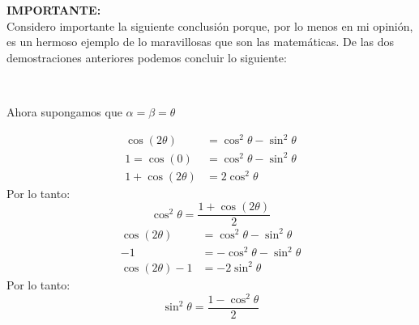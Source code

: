 \documentclass[12pt,openany]{book}
\begin{document}
			\noindent\textbf{IMPORTANTE:}\\
				Considero importante la siguiente conclusi\'on porque, por lo menos en mi opini\'on, es un
				hermoso ejemplo de lo maravillosas que son las matem\'aticas. 
				De las dos demostraciones anteriores podemos concluir lo siguiente:\\
				\begin{center}
					\doublebox{$\cos(\alpha\pm\beta)=\cos\alpha\cos\beta \pm \sin\alpha\sin\beta$}\\
				\end{center}
				Ahora supongamos que $\alpha=\beta=\theta$
				\begin{multicols}{2}
				\columnseprulecolor{\color{black}}
		    	\setlength{\columnseprule}{1pt}
					\begin{center}
						\begin{equation*}
							\begin{split}
								\cos(2\theta)&=\cos^{2}\theta-\sin^{2}\theta\\
								1=\cos(0)&=\cos^{2}\theta-\sin^{2}\theta\\
								1+\cos(2\theta)&=2\cos^{2}\theta
							\end{split}
						\end{equation*}
						Por lo tanto:
						$$
							\cos^{2}\theta=\frac{1+\cos(2\theta)}{2}	
						$$
				\breakcolumn
						\begin{equation*}
								\begin{split}
									\cos(2\theta)&=\cos^{2}\theta-\sin^{2}\theta\\
									-1&=-\cos^{2}\theta-\sin^{2}\theta\\
									\cos(2\theta)-1&=-2\sin^{2}\theta
								\end{split}
						\end{equation*}
						Por lo tanto:
						$$
							\sin^{2}\theta=\frac{1-\cos^{2}\theta}{2}	
						$$
					\end{center}
				\end{multicols}
				
\end{document}

